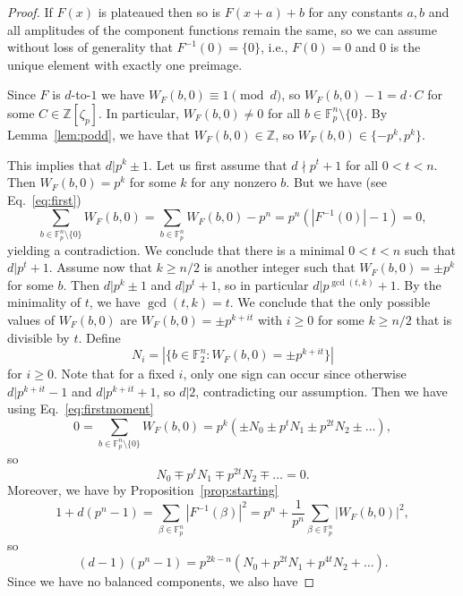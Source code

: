 \documentclass[10pt,a4paper]{amsart}
\newcommand{\F}{\mathbb F}
\newcommand{\Z}{\mathbb Z}
\begin{document}
\begin{proof}
    If $F(x)$ is plateaued then so is $F(x+a)+b$ for any constants $a,b$ and all amplitudes of the component functions remain the same, so we can assume without loss of generality that $F^{-1}(0)=\{0\}$, i.e., $F(0)=0$ and $0$ is the unique element with exactly one preimage.

    Since $F$ is $d$-to-$1$ we have $W_F(b,0) \equiv 1 \pmod{d}$, so $W_F(b,0)-1=d\cdot C$ for some $C \in \Z[\zeta_p]$. In particular, $W_F(b,0) \neq 0$ for all $b \in \F_p^n \setminus \{0\}$. By Lemma~\ref{lem:podd}, we have that $W_F(b,0) \in \Z$, so $W_F(b,0) \in \{-p^{k},p^k\}$.
    
    This implies that $d|p^{k}\pm 1$. 
    Let us first assume that $d\nmid p^t+1$ for all $0<t<n$. Then $W_F(b,0) =  p^{k}$ for some $k$ for any nonzero $b$. But we have (see Eq.~\eqref{eq:first})
    \begin{equation} \label{eq:firstmoment}
        \sum_{b \in \F_p^n \setminus \{0\}}W_F(b,0) =\sum_{b \in \F_p^n}W_F(b,0)-p^n = p^n(|F^{-1}(0)|-1)=0,
    \end{equation}
    yielding a contradiction. We conclude that there is a minimal $0<t<n$ such that $d|p^t+1$.  Assume now that $k\geq n/2$ is another integer such that $W_F(b,0)= \pm p^{k}$ for some $b$. Then $d|p^{k} \pm 1$ and $d|p^t+1$, so in particular $d|p^{\gcd(t,k)}+1$. By the minimality of $t$, we have $\gcd(t,k)=t$. We conclude that the only possible values of $W_F(b,0)$ are $W_F(b,0)= \pm p^{k+it}$ with $i \geq 0$ for some $k \geq n/2$ that is divisible by $t$. Define 
    \[N_i = |\{b\in \F_2^n \colon W_F(b,0)=\pm p^{k+it}\}|\]
    for $i\geq 0$. {Note that for a fixed $i$, only one sign can occur since otherwise $d|p^{k+it}-1$ and $d|p^{k+it}+1$, so $d|2$, contradicting our assumption.} 
    Then we have using Eq.~\eqref{eq:firstmoment}
    \[0=\sum_{b \in \F_p^n \setminus \{0\}}W_F(b,0) = p^{k}(\pm N_0\pm p^tN_1 \pm p^{2t}N_2\pm \dots),\]
    so 
    \begin{equation} \label{eq:1}
        N_0\mp p^tN_1 \mp p^{2t}N_2\mp \dots =0.
    \end{equation}
    Moreover, we have by Proposition~\ref{prop:starting}
    \[    1+d(p^n-1)=\sum_{\beta \in \F_{p}^n} |F^{-1}(\beta)|^2 = p^n + \frac{1}{p^n}\sum_{\beta \in \F_p^n}|W_F(b,0)|^2,
    \]
    so 
    \begin{equation} \label{eq:2}
        (d-1)(p^n-1)=p^{2k-n}(N_0+p^{2t}N_1+p^{4t}N_2+\dots).
    \end{equation}
    Since we have no balanced components, we also have

\end{proof}
\end{document}

